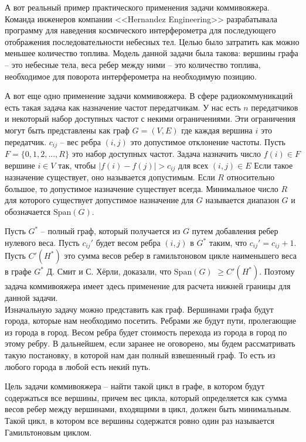\documentclass[a4paper, 14pt]{extarticle}
\numberwithin{equation}{section}
\begin{document}
А вот реальный пример практического применения задачи коммивояжера. Команда инженеров компании <<Hernandez Engineering>>  разрабатывала программу для наведения космического интерферометра для последующего отображения последовательности небесных тел. Целью было затратить как можно меньшее количество топлива. Модель данной задачи была такова: вершины графа -- это небесные тела, веса ребер между ними -- это количество топлива, необходимое для поворота интерферометра на необходимую позицию.

А вот еще одно применение задачи коммивояжера. В сфере радиокоммуникаций есть такая задача как назначение частот передатчикам. У нас есть $n$ передатчиков и некоторый набор доступных частот с некими ограничениями. Эти ограничения могут быть представлены как граф $G= (V, E)$ где каждая вершина $i$ это передатчик. $c_{ij}$ -- вес ребра $(i,j)$ это допустимое отклонение частоты. Пусть $F = \{ 0,1,2,...,R \}$ это набор доступных частот. Задача назначить число $f(i) \in F$ вершине $i \in V$ так, чтобы $\bigr\lvert f(i)-f(j)\bigr\rvert > c_{ij}$ для всех $(i,j) \in E$ Если такое назначение существует, оно называется допустимым. Если $R$ относительно большое, то допустимое назначение существует всегда. Минимальное число $R$ для которого существует допустимое назначение для $G$ называется диапазон $G$ и обозначается $\mathrm{Span}(G)$.

Пусть $G^*$ -- полный граф, который получается из $G$ путем добавления ребер нулевого веса. Пусть $c_{ij}'$ будет весом ребра $(i,j)$ в $G^*$ таким, что $c_{ij}' = c_{ij}+1$. Пусть $C'(H^*)$ это сумма весов ребер в гамильтоновом цикле наименьшего веса в графе $G^*$ Д. Смит и С. Хёрли, доказали, что $\mathrm{Span}(G)$ $\geqslant C'(H^*)$. Поэтому задача коммивояжера имеет здесь применение для расчета нижней границы для данной задачи. \\


Изначальную задачу можно представить как граф. Вершинами графа будут города, которые нам необходимо посетить. Ребрами же будут пути, пролегающие из города в город. Весом ребра будет стоимость перехода из города в город по этому ребру. В дальнейшем, если заранее не оговорено, мы будем рассматривать такую постановку, в которой нам дан полный взвешенный граф. То есть из любого города в любой есть некий путь.

Цель задачи коммивояжера -- найти такой цикл в графе, в котором будут содержаться все вершины, причем вес цикла, который определяется как сумма весов ребер между вершинами, входящими в цикл, должен быть минимальным. Такой цикл, в котором все вершины содержатся ровно один раз называется Гамильтоновым циклом.
\end{document}

